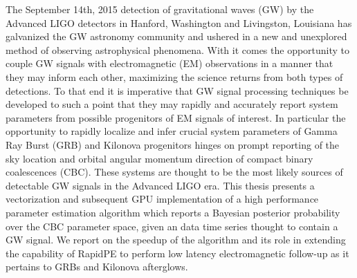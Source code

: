 % 
% 
%
The September 14th, 2015 detection of gravitational waves (GW) by the Advanced LIGO detectors in Hanford, Washington and Livingston, Louisiana has galvanized the GW astronomy community and ushered in a new and unexplored method of observing astrophysical phenomena. With it comes the opportunity to couple GW signals with electromagnetic (EM) observations in a manner that they may inform each other, maximizing the science returns from both types of detections. To that end it is imperative that GW signal processing techniques be developed to such a point that they may rapidly and accurately report system parameters from possible progenitors of EM signals of interest. In particular the opportunity to rapidly localize and infer crucial system parameters of Gamma Ray Burst (GRB) and Kilonova progenitors hinges on prompt reporting of the sky location and orbital angular momentum direction of compact binary coalescences (CBC). These systems are thought to be the most likely sources of detectable GW signals in the Advanced LIGO era. This thesis presents a vectorization and subsequent GPU implementation of a high performance parameter estimation algorithm which reports a Bayesian posterior probability over the CBC parameter space, given an data time series thought to contain a GW signal. We report on the speedup of the algorithm and its role in extending the capability of RapidPE to perform low latency electromagnetic follow-up as it pertains to GRBs and Kilonova afterglows.

